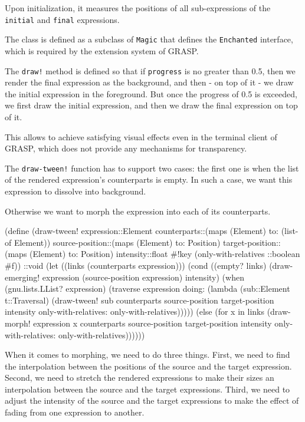 \documentclass[acmsmall]{acmart}
\newenvironment{Snippet}{\Verbatim[samepage=true]}{\endVerbatim}
\begin{document}
Upon initialization, it measures the positions of all sub-expressions
of the \texttt{initial} and \texttt{final} expressions.

The class is defined as a subclass of \texttt{Magic} that defines the
\texttt{Enchanted} interface, which is required by the extension system of
GRASP.

The \texttt{draw!} method is defined so that if \texttt{progress} is no greater than
0.5, then we render the final expression as the background, and then -
on top of it - we draw the initial expression in the foreground.  But
once the progress of 0.5 is exceeded, we first draw the initial
expression, and then we draw the final expression on top of it.

This allows to achieve satisfying visual effects even in the terminal client
of GRASP, which does not provide any mechanisms for transparency.

The \texttt{draw-tween!} function has to support two cases: the first one is
when the list of the rendered expression's counterparts is empty. In
such a case, we want this expression to dissolve into background.

Otherwise we want to morph the expression into each of its counterparts.

\begin{Snippet}
(define (draw-tween! expression::Element
		     counterparts::(maps (Element) to: (list-of Element))
		     source-position::(maps (Element) to: Position)
		     target-position::(maps (Element) to: Position)
		     intensity::float
		     #!key (only-with-relatives ::boolean #f))
  ::void
\end{Snippet}
\begin{Snippet}
  (let ((links (counterparts expression)))
    (cond
     ((empty? links)
      (draw-emerging! expression (source-position expression) intensity)
      (when (gnu.lists.LList? expression)
        (traverse
         expression
         doing:
         (lambda (sub::Element t::Traversal)
	   (draw-tween! sub counterparts source-position target-position
	                intensity only-with-relatives: only-with-relatives)))))
\end{Snippet}
\begin{Snippet}
    (else
     (for x in links
       (draw-morph! expression x counterparts source-position target-position
		    intensity only-with-relatives: only-with-relatives))))))
\end{Snippet}

When it comes to morphing, we need to do three things. First, we need
to find the interpolation between the positions of the source and the
target expression. Second, we need to stretch the rendered expressions
to make their sizes an interpolation between the source and the target
expressions.  Third, we need to adjust the intensity of the source and
the target expressions to make the effect of fading from one
expression to another.
\end{document}
